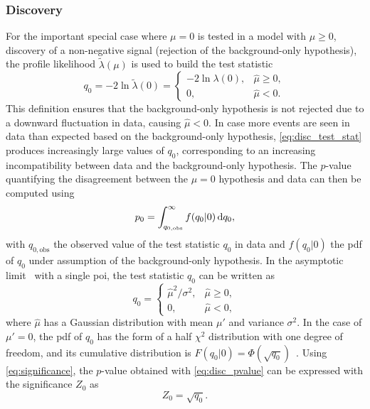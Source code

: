 \subsubsection{Discovery}
For the important special case where $\mu = 0$ is tested in a model with $\mu \geq 0$, \ie discovery of a non-negative signal (rejection of the background-only hypothesis), the profile likelihood $\tilde{\lambda}(\mu)$ is used to build the test statistic
\begin{equation}
	q_0 = -2\ln{\tilde{\lambda}(0)} = 
\begin{cases}
    -2\ln{\lambda(0)}, & \hat{\mu} \geq 0,\\
    0,              & \hat{\mu} < 0.
\end{cases}
\label{eq:disc_test_stat}
\end{equation}
This definition ensures that the background-only hypothesis is not rejected due to a downward fluctuation in data, causing $\hat{\mu} < 0$. In case more events are seen in data than expected based on the background-only hypothesis, \cref{eq:disc_test_stat} produces increasingly large values of $q_0$, corresponding to an increasing incompatibility between data and the background-only hypothesis. The $p$-value quantifying the disagreement between the $\mu = 0$ hypothesis and data can then be computed using
\begin{equation}
		p_0 = \int_{q_{0,\mathrm{obs}}}^{\infty}{f(q_0\vert 0)\mathop{}\!\mathrm{d} q_0},
		\label{eq:disc_pvalue}
\end{equation}
with $q_{0,\mathrm{obs}}$ the observed value of the test statistic $q_0$ in data and $f(q_0\vert 0)$ the \gls{pdf} of $q_0$ under assumption of the background-only hypothesis. In the asymptotic limit~\cite{Cowan:2010js} with a single \gls{poi}, the test statistic $q_0$ can be  written as
\begin{equation}
	q_0 = \begin{cases}
    \hat{\mu}^2/\sigma^2, & \hat{\mu} \geq 0,\\
    0,              & \hat{\mu} < 0,
\end{cases}
\label{eq:test_stat_disc_asymptotic}
\end{equation}
where $\hat{\mu}$ has a Gaussian distribution with mean $\mu '$ and variance $\sigma^2$. In the case of $\mu'=0$, the \gls{pdf} of $q_0$ has the form of a half $\chi^2$ distribution with one degree of freedom, and its cumulative distribution is $F(q_0 \vert 0) = \Phi(\sqrt{q_0})$~\cite{Cranmer:2015nia}. Using \cref{eq:significance}, the $p$-value obtained with \cref{eq:disc_pvalue} can be expressed with the significance $Z_0$ as
\begin{equation}
	Z_0 = \sqrt{q_0}.
\end{equation}


